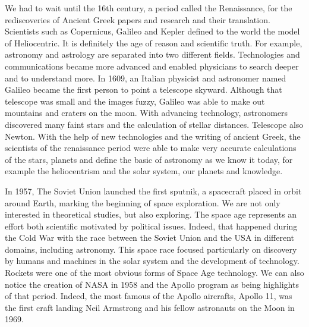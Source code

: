 We had to wait until the 16th century, a period called the Renaissance, for the rediscoveries of Ancient Greek papers and research and their translation. Scientists such as Copernicus, Galileo and Kepler defined to the world the model of Heliocentric. It is definitely the age of reason and scientific truth. For example, astronomy and astrology are separated into two different fields. Technologies and communications became more advanced and enabled physicians to search deeper and to understand more. In 1609, an Italian physicist and astronomer named Galileo became the first person to point a telescope skyward. Although that telescope was small and the images fuzzy, Galileo was able to make out mountains and craters on the moon. With advancing technology, astronomers discovered many faint stars and the calculation of stellar distances. Telescope also Newton. With the help of new technologies and the writing of ancient Greek, the scientists of the renaissance period were able to make very accurate calculations of the stars, planets and define the basic of astronomy as we know it today, for example the heliocentrism and the solar system, our planets and knowledge.

In 1957, The Soviet Union launched the first sputnik, a spacecraft placed in orbit around Earth, marking the beginning of space exploration. We are not only interested in theoretical studies, but also exploring. The space age represents an effort both scientific motivated by political issues. Indeed, that happened during the Cold War with the race between the Soviet Union and the USA in different domains, including astronomy. This space race focused particularly on discovery by humans and machines in the solar system and the development of technology. Rockets were one of the most obvious forms of Space Age technology. We can also notice the creation of NASA in 1958 and the Apollo program as being highlights of that period. Indeed, the most famous of the Apollo aircrafts, Apollo 11, was the first craft landing Neil Armstrong and his fellow astronauts on the Moon in 1969.